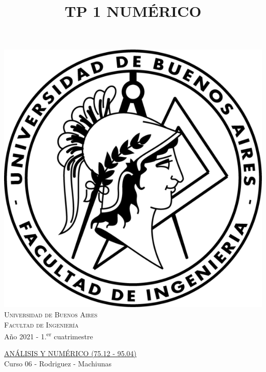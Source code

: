 \documentclass[10pt,a4paper]{article}
\numberwithin{equation}{section}
\numberwithin{figure}{section}
\numberwithin{table}{section}
\begin{document}

\title{TP 1 NUMÉRICO }    


\begin{titlepage}
	\vspace*{30mm}

	\begin{center}
	    \includegraphics[scale=1.2]{../Images/Logo_Fiuba2.png}\\
		\huge{\textsc{Universidad de Buenos Aires}}\\
		\huge{\textsc{Facultad de Ingeniería}}\\
		\vspace*{5mm}
		\large{Año 2021 - 1.\textsuperscript{er} cuatrimestre}
	\end{center}

	\vspace*{15mm}

	\begin{center}
		\huge{\underline{\textsc{ANÁLISIS Y NUMÉRICO (75.12 - 95.04)}}}\\
		\vspace*{5mm}
		\large{Curso 06 - Rodriguez - Machiunas}
	\end{center}


\end{titlepage}
\end{document}
